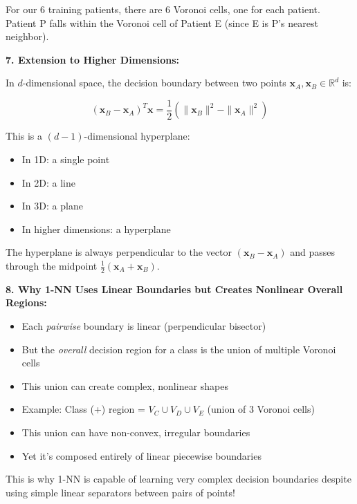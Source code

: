 \documentclass[12pt]{article}
\begin{document}
\begin{explanation}
For our 6 training patients, there are 6 Voronoi cells, one for each patient. Patient P falls within the Voronoi cell of Patient E (since E is P's nearest neighbor).

\textbf{7. Extension to Higher Dimensions:}

In \(d\)-dimensional space, the decision boundary between two points \(\mathbf{x}_A, \mathbf{x}_B \in \mathbb{R}^d\) is:

\[
(\mathbf{x}_B - \mathbf{x}_A)^T \mathbf{x} = \frac{1}{2}(\|\mathbf{x}_B\|^2 - \|\mathbf{x}_A\|^2)
\]

This is a \((d-1)\)-dimensional hyperplane:
\begin{itemize}
    \item In 1D: a single point
    \item In 2D: a line
    \item In 3D: a plane
    \item In higher dimensions: a hyperplane
\end{itemize}

The hyperplane is always perpendicular to the vector \((\mathbf{x}_B - \mathbf{x}_A)\) and passes through the midpoint \(\frac{1}{2}(\mathbf{x}_A + \mathbf{x}_B)\).

\textbf{8. Why 1-NN Uses Linear Boundaries but Creates Nonlinear Overall Regions:}

\begin{itemize}
    \item Each \textit{pairwise} boundary is linear (perpendicular bisector)
    \item But the \textit{overall} decision region for a class is the union of multiple Voronoi cells
    \item This union can create complex, nonlinear shapes
    \item Example: Class (+) region = \(V_C \cup V_D \cup V_E\) (union of 3 Voronoi cells)
    \item This union can have non-convex, irregular boundaries
    \item Yet it's composed entirely of linear piecewise boundaries
\end{itemize}

This is why 1-NN is capable of learning very complex decision boundaries despite using simple linear separators between pairs of points!
\end{explanation}
\end{document}
